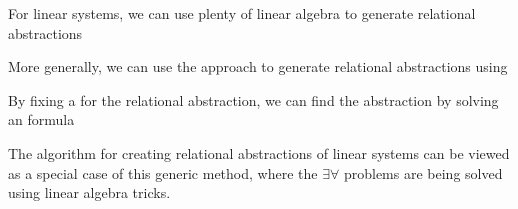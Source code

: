 \documentclass{seminar}
\begin{document}
\begin{slide}

For linear systems, we can use plenty of linear algebra
to {} generate relational abstractions

\medskip
More generally, we can use the {} approach to generate
relational abstractions using {}

\medskip
By fixing a {} for the relational abstraction,
we can find the abstraction by solving an {\cem{$\exists\forall$}} formula

\medskip
The algorithm for creating relational abstractions of linear systems
can be viewed as
a special case of this generic method, where the
$\exists\forall$ problems are being solved using linear algebra tricks.

\end{slide}
\end{document}
